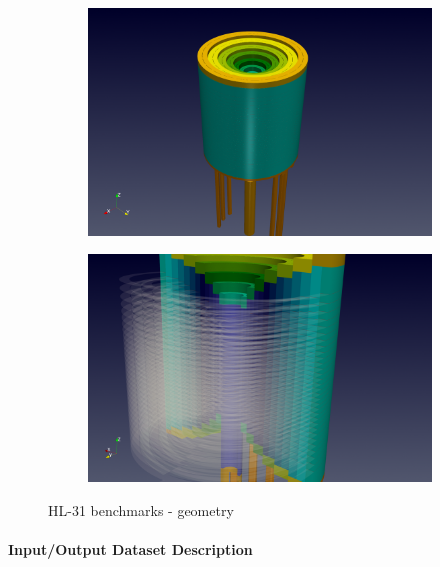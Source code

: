 \begin{figure}[h]
  \centering
  \begin{subfigure}[c]{0.49\textwidth}
    \centering
    \includegraphics[width=\textwidth]{graphics/feelpp/feelpp-benchmark-HL-31-geo.png}
  \end{subfigure}
  \hfill
  \begin{subfigure}[c]{0.49\textwidth}
    \centering
    \includegraphics[width=\textwidth]{graphics/feelpp/feelpp-benchmark-HL-31-geo-zoom.png}
  \end{subfigure}
  \caption{HL-31 benchmarks - geometry}
  \label{fig:wp1:feelpp:hl-31:visualization-geometry}
\end{figure}


\paragraph{Input/Output Dataset Description}


